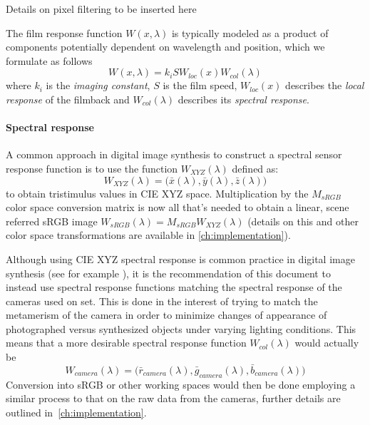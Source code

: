 \begin{inconstruction}
 Details on pixel filtering to be inserted here
\end{inconstruction}

The film response function $W(x, \lambda)$ is typically modeled as a product of
components potentially dependent on wavelength and position, which we formulate
as follows
\begin{equation}
W(x,\lambda) = k_i S W_{loc}(x) W_{col}(\lambda)
\end{equation}
where $k_i$ is the \textsl{imaging constant}, $S$ is the film speed,
$W_{loc}(x)$ describes the \textsl{local response} of the filmback and
$W_{col}(\lambda)$ describes its \textsl{spectral response}.

\paragraph{Spectral response}
A common approach in digital image synthesis to construct a spectral sensor
response function is to use the function $W_{XYZ}(\lambda)$ defined as:
\begin{equation}
W_{XYZ}(\lambda) = \big(\bar x(\lambda), \bar y (\lambda), \bar z(\lambda)\big)
\end{equation}
to obtain tristimulus values in \gls{CIE} \gls{XYZ} space.
Multiplication by the $M_{sRGB}$ color space conversion matrix is now all
that's needed to obtain a linear, scene referred \gls{sRGB} image
$W_{sRGB}(\lambda) = M_{sRGB} W_{XYZ}(\lambda)$
(details on this and other color space transformations are available in
\cref{ch:implementation}).

Although using \gls{CIE} \gls{XYZ} spectral response is common practice
in digital image synthesis (see for example \cite{pharr2010, jakob2010,
ward1994}), it is the recommendation of this document to instead use spectral
response functions matching the spectral response of the cameras used on set.
This is done in the interest of trying to match the metamerism of the camera in
order to minimize changes of appearance of photographed versus synthesized
objects under varying lighting conditions. This means that a more desirable
spectral response function $W_{col}(\lambda)$ would actually be
\begin{equation}
W_{camera}(\lambda) = \big(\bar r_{camera}(\lambda), \bar g_{camera}(\lambda),
\bar b_{camera}(\lambda)\big)
\end{equation}
Conversion into \gls{sRGB} or other working spaces would then be done employing
a similar process to that on the raw data from the cameras, further details are
outlined in~\cref{ch:implementation}.


